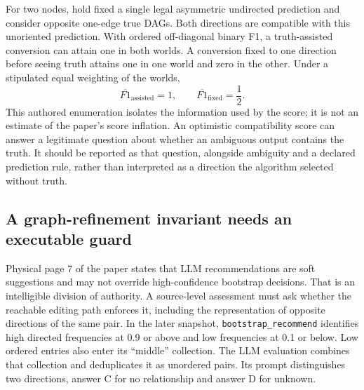 For two nodes, hold fixed a single legal asymmetric undirected prediction and
consider opposite one-edge true DAGs. Both directions are compatible with this
unoriented prediction. With ordered off-diagonal binary F1, a truth-assisted
conversion can attain one in both worlds. A conversion fixed to one direction
before seeing truth attains one in one world and zero in the other. Under a
stipulated equal weighting of the worlds,
\begin{equation}
 \overline{F1}_{\mathrm{assisted}}=1,\qquad
 \overline{F1}_{\mathrm{fixed}}=\frac12.
 \label{exec17:copilot-score}
\end{equation}
This authored enumeration isolates the information used by the score; it is
not an estimate of the paper's score inflation. An optimistic compatibility
score can answer a legitimate question about whether an ambiguous output
contains the truth. It should be reported as that question, alongside ambiguity
and a declared prediction rule, rather than interpreted as a direction the
algorithm selected without truth.~\citep{exec17_copilot_exact}

\subsection{A graph-refinement invariant needs an executable guard}

Physical page 7 of the paper states that LLM recommendations are soft
suggestions and may not override high-confidence bootstrap decisions. That
is an intelligible division of authority. A source-level assessment must ask
whether the reachable editing path enforces it, including the representation
of opposite directions of the same pair. In the later snapshot,
\texttt{bootstrap\_recommend} identifies high directed frequencies at 0.9 or
above and low frequencies at 0.1 or below. Low ordered entries also enter its
``middle'' collection. The LLM evaluation combines that collection and
deduplicates it as unordered pairs. Its prompt distinguishes two directions,
answer C for no relationship and answer D for unknown.
\citep{exec17_copilot_paper,exec17_copilot_code}

